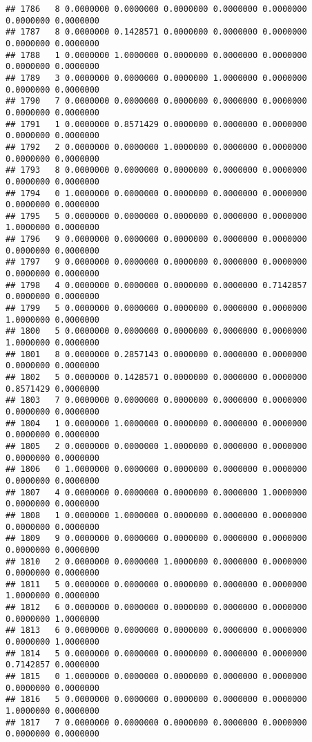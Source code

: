 \documentclass[
]{article}
\begin{document}
\begin{verbatim}
## 1786   8 0.0000000 0.0000000 0.0000000 0.0000000 0.0000000 0.0000000 0.0000000
## 1787   8 0.0000000 0.1428571 0.0000000 0.0000000 0.0000000 0.0000000 0.0000000
## 1788   1 0.0000000 1.0000000 0.0000000 0.0000000 0.0000000 0.0000000 0.0000000
## 1789   3 0.0000000 0.0000000 0.0000000 1.0000000 0.0000000 0.0000000 0.0000000
## 1790   7 0.0000000 0.0000000 0.0000000 0.0000000 0.0000000 0.0000000 0.0000000
## 1791   1 0.0000000 0.8571429 0.0000000 0.0000000 0.0000000 0.0000000 0.0000000
## 1792   2 0.0000000 0.0000000 1.0000000 0.0000000 0.0000000 0.0000000 0.0000000
## 1793   8 0.0000000 0.0000000 0.0000000 0.0000000 0.0000000 0.0000000 0.0000000
## 1794   0 1.0000000 0.0000000 0.0000000 0.0000000 0.0000000 0.0000000 0.0000000
## 1795   5 0.0000000 0.0000000 0.0000000 0.0000000 0.0000000 1.0000000 0.0000000
## 1796   9 0.0000000 0.0000000 0.0000000 0.0000000 0.0000000 0.0000000 0.0000000
## 1797   9 0.0000000 0.0000000 0.0000000 0.0000000 0.0000000 0.0000000 0.0000000
## 1798   4 0.0000000 0.0000000 0.0000000 0.0000000 0.7142857 0.0000000 0.0000000
## 1799   5 0.0000000 0.0000000 0.0000000 0.0000000 0.0000000 1.0000000 0.0000000
## 1800   5 0.0000000 0.0000000 0.0000000 0.0000000 0.0000000 1.0000000 0.0000000
## 1801   8 0.0000000 0.2857143 0.0000000 0.0000000 0.0000000 0.0000000 0.0000000
## 1802   5 0.0000000 0.1428571 0.0000000 0.0000000 0.0000000 0.8571429 0.0000000
## 1803   7 0.0000000 0.0000000 0.0000000 0.0000000 0.0000000 0.0000000 0.0000000
## 1804   1 0.0000000 1.0000000 0.0000000 0.0000000 0.0000000 0.0000000 0.0000000
## 1805   2 0.0000000 0.0000000 1.0000000 0.0000000 0.0000000 0.0000000 0.0000000
## 1806   0 1.0000000 0.0000000 0.0000000 0.0000000 0.0000000 0.0000000 0.0000000
## 1807   4 0.0000000 0.0000000 0.0000000 0.0000000 1.0000000 0.0000000 0.0000000
## 1808   1 0.0000000 1.0000000 0.0000000 0.0000000 0.0000000 0.0000000 0.0000000
## 1809   9 0.0000000 0.0000000 0.0000000 0.0000000 0.0000000 0.0000000 0.0000000
## 1810   2 0.0000000 0.0000000 1.0000000 0.0000000 0.0000000 0.0000000 0.0000000
## 1811   5 0.0000000 0.0000000 0.0000000 0.0000000 0.0000000 1.0000000 0.0000000
## 1812   6 0.0000000 0.0000000 0.0000000 0.0000000 0.0000000 0.0000000 1.0000000
## 1813   6 0.0000000 0.0000000 0.0000000 0.0000000 0.0000000 0.0000000 1.0000000
## 1814   5 0.0000000 0.0000000 0.0000000 0.0000000 0.0000000 0.7142857 0.0000000
## 1815   0 1.0000000 0.0000000 0.0000000 0.0000000 0.0000000 0.0000000 0.0000000
## 1816   5 0.0000000 0.0000000 0.0000000 0.0000000 0.0000000 1.0000000 0.0000000
## 1817   7 0.0000000 0.0000000 0.0000000 0.0000000 0.0000000 0.0000000 0.0000000

\end{verbatim}
\end{document}

